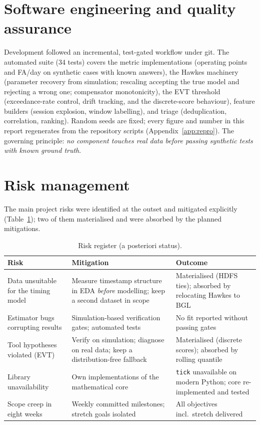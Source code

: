\documentclass[11pt,a4paper]{report}
\newcommand{\code}[1]{\texttt{\small #1}}
\begin{document}
\section{Software engineering and quality assurance}
\label{sec:method-engineering}
Development followed an incremental, test-gated workflow under git.
The automated suite (34 tests) covers the metric implementations
(operating points and FA/day on synthetic cases with known answers), the
Hawkes machinery (parameter recovery from simulation; rescaling accepting
the true model and rejecting a wrong one; compensator monotonicity), the
EVT threshold (exceedance-rate control, drift tracking, and the
discrete-score behaviour), feature builders (session explosion, window
labelling), and triage (deduplication, correlation, ranking). Random seeds
are fixed; every figure and number in this report regenerates from the
repository scripts (Appendix~\ref{app:repro}). The governing principle:
\emph{no component touches real data before passing synthetic tests with
known ground truth}.

\section{Risk management}
\label{sec:method-risks}
The main project risks were identified at the outset and mitigated
explicitly (Table~\ref{tab:risks}); two of them materialised and were
absorbed by the planned mitigations.

\begin{table}[H]
\centering
\caption{Risk register (a posteriori status).}
\label{tab:risks}
\small
\renewcommand{\arraystretch}{1.25}
\begin{tabular}{@{}p{4.2cm} p{5.4cm} p{4.2cm}@{}}
\toprule
\textbf{Risk} & \textbf{Mitigation} & \textbf{Outcome} \\
\midrule
Data unsuitable for the timing model & Measure timestamp structure in EDA
\emph{before} modelling; keep a second dataset in scope & Materialised
(HDFS ties); absorbed by relocating Hawkes to BGL \\
Estimator bugs corrupting results & Simulation-based verification gates;
automated tests & No fit reported without passing gates \\
Tool hypotheses violated (EVT) & Verify on simulation; diagnose on real
data; keep a distribution-free fallback & Materialised (discrete scores);
absorbed by rolling quantile \\
Library unavailability & Own implementations of the mathematical core &
\code{tick} unavailable on modern Python; core re-implemented and tested \\
Scope creep in eight weeks & Weekly committed milestones; stretch goals
isolated & All objectives incl.\ stretch delivered \\
\bottomrule
\end{tabular}
\end{table}
\end{document}
